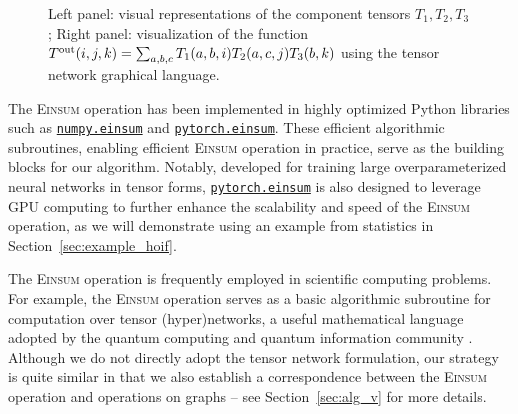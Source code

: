 \documentclass[letterpaper,11pt]{article}
\def\Einsum{\textsc{Einsum}}
\newcommand{\libref}[2]{\href{#2}{\texttt{#1}}}
\newcommand{\numpyeinsum}{\libref{numpy.einsum}{https://numpy.org/doc/2.1/reference/generated/numpy.einsum.html}}
\newcommand{\torcheinsum}{\libref{pytorch.einsum}{https://pytorch.org/docs/stable/generated/torch.einsum.html}}
\begin{document}
\begin{bibunit}[plainnat]
\begin{figure}[ht]
\caption{
Left panel: visual representations of the component tensors $T_1, T_2, T_3$;  
Right panel: visualization of the function 
$T^{\rm out} (i,j,k) = \sum_{a,b,c} T_1 (a,b,i) T_2 (a,c,j) T_3 (b,k)$ using the tensor network graphical language.
}
\label{fig:tensor_network_example}
\end{figure}
\fi

\begin{remark}
\label{rem:Python}
The \Einsum{} operation has been implemented in highly optimized Python libraries such as \numpyeinsum{} and \torcheinsum{}. These efficient algorithmic subroutines, enabling efficient \Einsum{} operation in practice, serve as the building blocks for our algorithm. Notably, developed for training large overparameterized neural networks in tensor forms, \torcheinsum{} is also designed to leverage GPU computing to further enhance the scalability and speed of the \Einsum{} operation, as we will demonstrate using an example from statistics in Section~\ref{sec:example_hoif}.
\end{remark}

\begin{remark}
\label{rem:tensor networks}
The \Einsum{} operation is frequently employed in scientific computing problems. For example, the \Einsum{} operation serves as a basic algorithmic subroutine for computation over tensor (hyper)networks, a useful mathematical language adopted by the quantum computing and quantum information community \citep{markov2008simulating, stoudenmire2018learning}. %
Although we do not directly adopt the tensor network formulation, our strategy is quite similar in that we also establish a correspondence between the \Einsum{} operation and operations on graphs -- see Section~\ref{sec:alg_v} for more details. 
\end{remark}


\end{bibunit}
\end{document}
